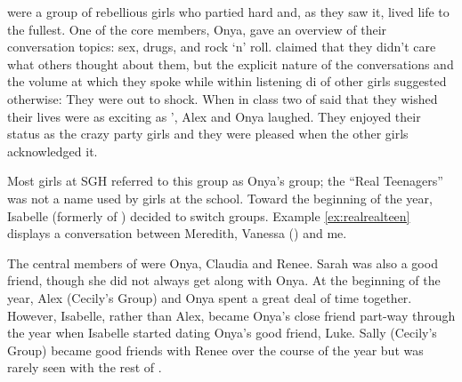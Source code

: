 \nocite{geertz1973}

 were a group of rebellious girls who partied hard and, as they saw it, lived life to the fullest. One of the core members, Onya, gave an overview of their conversation topics: sex, drugs, and rock `n' roll.  claimed that they didn't care what others thought about them, but the explicit nature of the conversations and the volume at which they spoke while within listening di of other girls suggested otherwise: They were out to shock. When in class two of  said that they wished their lives were as exciting as ', Alex and Onya laughed. They enjoyed their status as the crazy party girls and they were pleased when the other girls acknowledged it.

\largerpage
Most girls at SGH referred to this group as Onya's group; the ``Real Teenagers'' was not a name used by girls at the school. Toward the beginning of the year, Isabelle (formerly of ) decided to switch groups. Example \ref{ex:realrealteen} displays a conversation between Meredith, Vanessa () and me. 

\label{ex:realrealteen}

\vspace{5 mm}

\noindent The central members of  were Onya, Claudia and Renee. Sarah was also a good friend, though she did not always get along with Onya. At the beginning of the year, Alex (Cecily's Group) and Onya spent a great deal of time together. However, Isabelle, rather than Alex, became Onya's close friend part-way through the year when Isabelle started dating Onya's good friend, Luke. Sally (Cecily's Group) became good friends with Renee over the course of the year but was rarely seen with the rest of .

